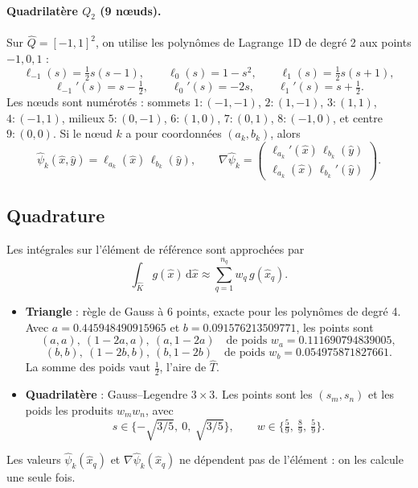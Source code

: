 \documentclass[11pt,a4paper]{article}
\begin{document}
\paragraph{Quadrilatère $Q_2$ (9 nœuds).} Sur $\widehat{Q} = [-1,1]^2$, on
utilise les polynômes de Lagrange 1D de degré 2 aux points $-1, 0, 1$ :
\[
\ell_{-1}(s) = \tfrac12 s(s-1), \qquad
\ell_{0}(s) = 1 - s^2, \qquad
\ell_{1}(s) = \tfrac12 s(s+1),
\]
\[
\ell_{-1}'(s) = s - \tfrac12, \qquad
\ell_{0}'(s) = -2s, \qquad
\ell_{1}'(s) = s + \tfrac12 .
\]
Les nœuds sont numérotés : sommets $1{:}(-1,-1)$, $2{:}(1,-1)$,
$3{:}(1,1)$, $4{:}(-1,1)$, milieux $5{:}(0,-1)$, $6{:}(1,0)$, $7{:}(0,1)$,
$8{:}(-1,0)$, et centre $9{:}(0,0)$. Si le nœud $k$ a pour coordonnées
$(a_k, b_k)$, alors
\[
\widehat{\psi}_k(\hat{x},\hat{y}) = \ell_{a_k}(\hat{x})\,\ell_{b_k}(\hat{y}),
\qquad
\nabla\widehat{\psi}_k =
\begin{pmatrix}
\ell_{a_k}'(\hat{x})\,\ell_{b_k}(\hat{y}) \\
\ell_{a_k}(\hat{x})\,\ell_{b_k}'(\hat{y})
\end{pmatrix}.
\]

\subsection{Quadrature}

Les intégrales sur l'élément de référence sont approchées par
\[
\int_{\widehat{K}} g(\hat{x}) \,\mathrm{d}\hat{x}
\approx \sum_{q=1}^{n_q} w_q\, g(\hat{x}_q).
\]
\begin{itemize}
  \item \textbf{Triangle} : règle de Gauss à 6 points, exacte pour les
        polynômes de degré 4. Avec $a = 0.445948490915965$ et
        $b = 0.091576213509771$, les points sont
        \[
        (a,a),\ (1-2a,a),\ (a,1-2a) \quad \text{de poids } w_a = 0.111690794839005,
        \]
        \[
        (b,b),\ (1-2b,b),\ (b,1-2b) \quad \text{de poids } w_b = 0.054975871827661.
        \]
        La somme des poids vaut $\tfrac12$, l'aire de $\widehat{T}$.
  \item \textbf{Quadrilatère} : Gauss--Legendre $3 \times 3$. Les points
        sont les $(s_m, s_n)$ et les poids les produits $w_m w_n$, avec
        \[
        s \in \{-\sqrt{3/5},\ 0,\ \sqrt{3/5}\},
        \qquad
        w \in \{\tfrac59,\ \tfrac89,\ \tfrac59\}.
        \]
\end{itemize}
Les valeurs $\widehat{\psi}_k(\hat{x}_q)$ et $\nabla\widehat{\psi}_k(\hat{x}_q)$
ne dépendent pas de l'élément : on les calcule une seule fois.
\end{document}
